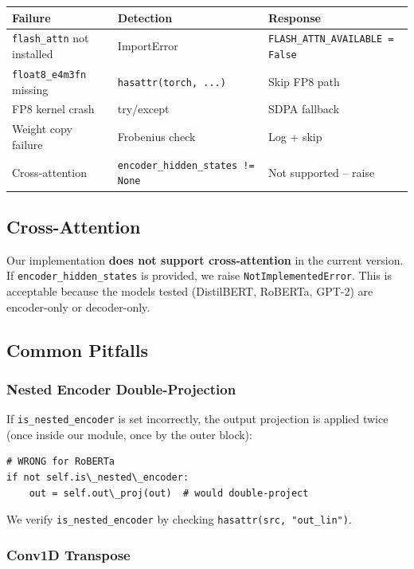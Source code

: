 \begin{table}[H]
\centering
\small
\begin{tabular}{lll}
\toprule
\textbf{Failure} & \textbf{Detection} & \textbf{Response} \\
\midrule
\texttt{flash\_attn} not installed & ImportError & \texttt{FLASH\_ATTN\_AVAILABLE = False} \\
\texttt{float8\_e4m3fn} missing & \texttt{hasattr(torch, ...)} & Skip FP8 path \\
FP8 kernel crash & try/except & SDPA fallback \\
Weight copy failure & Frobenius check & Log + skip \\
Cross-attention & \texttt{encoder\_hidden\_states != None} & Not supported -- raise \\
\bottomrule
\end{tabular}
\end{table}

\subsection{Cross-Attention}

Our implementation \textbf{does not support cross-attention} in the current 
version. If \texttt{encoder\_hidden\_states} is provided, we raise 
\texttt{NotImplementedError}. This is acceptable because the models tested 
(DistilBERT, RoBERTa, GPT-2) are encoder-only or decoder-only.

\subsection{Common Pitfalls}

\subsubsection{Nested Encoder Double-Projection}

If \texttt{is\_nested\_encoder} is set incorrectly, the output projection is applied 
twice (once inside our module, once by the outer block):

\begin{lstlisting}
# WRONG for RoBERTa
if not self.is\_nested\_encoder:
    out = self.out\_proj(out)  # would double-project
\end{lstlisting}

We verify \texttt{is\_nested\_encoder} by checking \texttt{hasattr(src, "out\_lin")}.

\subsubsection{Conv1D Transpose}

